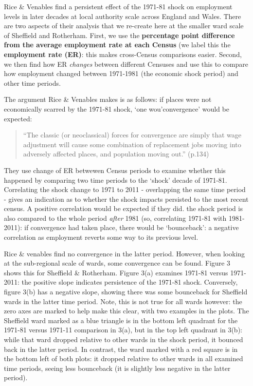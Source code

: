 \documentclass[
]{article}
\begin{document}
Rice \& Venables find a persistent effect of the 1971-81 shock on
employment levels in later decades at local authority scale across
England and Wales. There are two aspects of their analysis that we
re-create here at the smaller ward scale of Sheffield and Rotherham.
First, we use the \textbf{percentage point difference from the average
employment rate at each Census} (we label this the \textbf{employment
rate (ER)}: this makes cross-Census comparisons easier. Second, we then
find how ER \emph{changes} between different Censuses and use this to
compare how employment changed between 1971-1981 (the economic shock
period) and other time periods.

The argument Rice \& Venables makes is as follows: if places were not
economically scarred by the 1971-81 shock, `one wou'convergence' would
be expected:

\begin{quote}
``The classic (or neoclassical) forces for convergence are simply that
wage adjustment will cause some combination of replacement jobs moving
into adversely affected places, and population moving out.'' (p.134)
\end{quote}

They use change of ER betwewen Census periods to examine whether this
happened by comparing two time periods to the `shock' decade of 1971-81.
Correlating the shock change to 1971 to 2011 - overlapping the same time
period - gives an indication as to whether the shock impacts persisted
to the most recent census. A positive correlation would be expected if
they did. the shock period is also compared to the whole period
\emph{after} 1981 (so, correlating 1971-81 with 1981-2011): if
convergence had taken place, there would be `bounceback': a negative
correlation as employment reverts some way to its previous level.

Rice \& venables find no convergence in the latter period. However, when
looking at the sub-regional scale of wards, some convergence can be
found. Figure 3 shows this for Sheffield \& Rotherham. Figure 3(a)
examines 1971-81 versus 1971-2011: the positive slope indicates
persistence of the 1971-81 shock. Conversely, figure 3(b) has a negative
slope, showing there was some bounceback for Sheffield wards in the
latter time period. Note, this is not true for all wards however: the
zero axes are marked to help make this clear, with two examples in the
plots. The Sheffield ward marked as a blue triangle is in the bottom
left quadrant for the 1971-81 versus 1971-11 comparison in 3(a), but in
the top left quadrant in 3(b): while that ward dropped relative to other
wards in the shock period, it bounced back in the latter period. In
contrast, the ward marked with a red square is in the bottom left of
both plots: it dropped relative to other wards in all examined time
periods, seeing less bounceback (it is slightly less negative in the
latter period).
\end{document}
